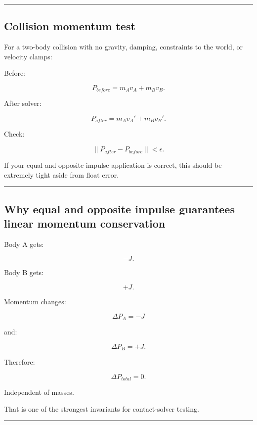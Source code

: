 \begin{center}\rule{0.5\linewidth}{0.5pt}\end{center}

\subsection{Collision momentum test}\label{06-engine-ii-ch039-collision-momentum-test}

For a two-body collision with no gravity, damping, constraints to the world, or velocity clamps:

Before:

\[
P_{before}
=
m_Av_A+
m_Bv_B.
\]

After solver:

\[
P_{after}
=
m_Av_A'+
m_Bv_B'.
\]

Check:

\[
\boxed{
\|P_{after}-P_{before}\|
<
\epsilon.
}
\]

If your equal-and-opposite impulse application is correct, this should be extremely tight aside from float error.

\begin{center}\rule{0.5\linewidth}{0.5pt}\end{center}

\subsection{Why equal and opposite impulse guarantees linear momentum conservation}\label{06-engine-ii-ch039-why-equal-and-opposite-impulse-guarantees-linear-momentum-conservation}

Body A gets:

\[
-J.
\]

Body B gets:

\[
+J.
\]

Momentum changes:

\[
\Delta P_A=-J
\]

and:

\[
\Delta P_B=+J.
\]

Therefore:

\[
\Delta P_{total}=0.
\]

Independent of masses.

That is one of the strongest invariants for contact-solver testing.

\begin{center}\rule{0.5\linewidth}{0.5pt}\end{center}

